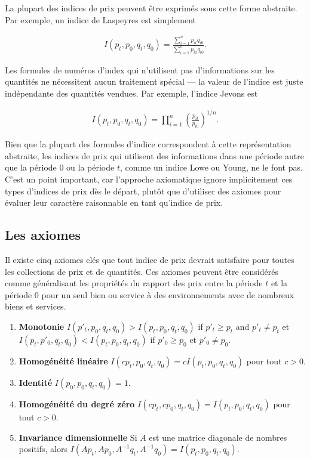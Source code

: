 \documentclass[
]{article}
\begin{document}
La plupart des indices de prix peuvent être exprimés sous cette forme abstraite. Par exemple, un indice de Laspeyres est simplement

\begin{align*}
I(p_{t}, p_{0}, q_{t}, q_{0}) = \frac{\sum_{i = 1}^{n} p_{it} q_{i0}} {\sum_{i = 1}^{n} p_{i0} q_{i0}}.
\end{align*}

Les formules de numéros d'index qui n'utilisent pas d'informations sur les quantités ne nécessitent aucun traitement spécial --- la valeur de l'indice est juste indépendante des quantités vendues. Par exemple, l'indice Jevons est

\begin{align*}
I(p_{t}, p_{0}, q_{t}, q_{0}) = \prod_{i = 1}^{n} \left(\frac{p_{it}} {p_{i0} } \right)^{1 / n}.
\end{align*}

Bien que la plupart des formules d'indice correspondent à cette représentation abstraite, les indices de prix qui utilisent des informations dans une période autre que la période 0 ou la période \(t\), comme un indice Lowe ou Young, ne le font pas. C'est un point important, car l'approche axiomatique ignore implicitement ces types d'indices de prix dès le départ, plutôt que d'utiliser des axiomes pour évaluer leur caractère raisonnable en tant qu'indice de prix.

\hypertarget{les-axiomes}{%
\subsection{Les axiomes}\label{les-axiomes}}

Il existe cinq axiomes clés que tout indice de prix devrait satisfaire pour toutes les collections de prix et de quantités. Ces axiomes peuvent être considérés comme généralisant les propriétés du rapport des prix entre la période \(t\) et la période 0 pour un seul bien ou service à des environnements avec de nombreux biens et services.

\begin{enumerate}
\def\labelenumi{\arabic{enumi}.}
\item
  \textbf{Monotonie} \(I(p'_{t}, p_{0}, q_{t}, q_{0})> I(p_{t}, p_{0}, q_{t}, q_{0})\) if \(p'_{t} \geq p_{t}\) and \(p'_{t} \neq p_{t}\) et \(I(p_{t}, p'_{0}, q_{t}, q_{0}) <I(p_{t}, p_{0}, q_{t}, q_{0})\) if \(p'_{0} \geq p_{0 }\) et \(p'_{0} \neq p_{0}\).
\item
  \textbf{Homogénéité linéaire} \(I(cp_{t}, p_{0}, q_{t}, q_{0}) = cI(p_{t}, p_{0}, q_{t}, q_{0})\) pour tout \(c> 0\).
\item
  \textbf{Identité} \(I(p_{0}, p_{0}, q_{t}, q_{0}) = 1\).
\item
  \textbf{Homogénéité du degré zéro} \(I(cp_{t}, cp_{0}, q_{t}, q_{0}) = I(p_{t}, p_{0}, q_{t} , q_{0})\) pour tout \(c> 0\).
\item
  \textbf{Invariance dimensionnelle} Si \(A\) est une matrice diagonale de nombres positifs, alors \(I(Ap_{t}, Ap_{0}, A^{-1} q_{t}, A^{-1} q_{0}) = I(p_{t}, p_{0}, q_{t}, q_{0})\).
\end{enumerate}
\end{document}
